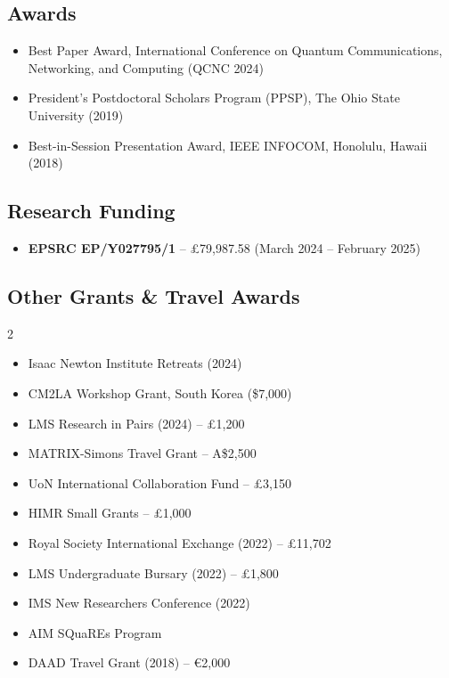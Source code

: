\documentclass[11pt,a4paper,sans]{moderncv}
\begin{document}
\subsection{Awards}
\begin{itemize}
    \item Best Paper Award, International Conference on Quantum Communications, Networking, and Computing (QCNC 2024)
    \item President's Postdoctoral Scholars Program (PPSP), The Ohio State University (2019)
    \item Best-in-Session Presentation Award, IEEE INFOCOM, Honolulu, Hawaii (2018)
\end{itemize}

\subsection{Research Funding}
\begin{itemize}
    \item \textbf{EPSRC EP/Y027795/1} -- £79,987.58 (March 2024 -- February 2025)
\end{itemize}

\subsection{Other Grants \& Travel Awards}
\begin{multicols}{2}
\begin{itemize}
    \item Isaac Newton Institute Retreats (2024)
    \item CM2LA Workshop Grant, South Korea (\$7,000)
    \item LMS Research in Pairs (2024) -- £1,200
    \item MATRIX-Simons Travel Grant -- A\$2,500
    \item UoN International Collaboration Fund -- £3,150
    \item HIMR Small Grants -- £1,000
    \item Royal Society International Exchange (2022) -- £11,702
    \item LMS Undergraduate Bursary (2022) -- £1,800
    \item IMS New Researchers Conference (2022)
    \item AIM SQuaREs Program
    \item DAAD Travel Grant (2018) -- €2,000
\end{itemize}
\end{multicols}
\end{document}
